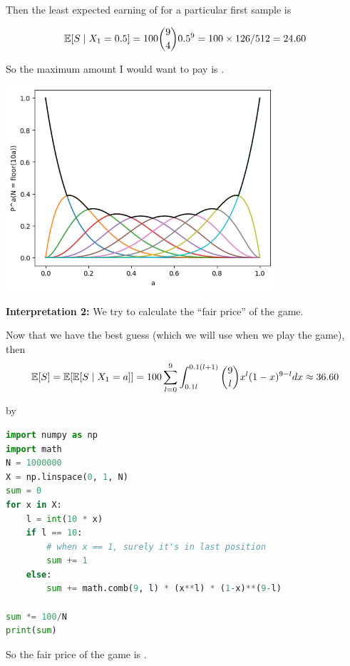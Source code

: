 \documentclass[a4paper, 10pt]{article}
\begin{document}
Then the least expected earning of for a particular first sample is 

\[
    \mathbb{E}[S \mid X_1 = 0.5] = 100 \binom{9}{4} 0.5^9 = 100 \times 126 / 512 = 24.60
\]

So the maximum amount I would want to pay is .

\begin{center}
    \includegraphics*[width = 10cm]{output.png}
\end{center}

\textbf{Interpretation 2: } We try to calculate the ``fair price'' of the game.

Now that we have the best guess (which we will use when we play the game), then
\[
\mathbb{E}[S] = \mathbb{E} [\mathbb{E}[S \mid X_1 = a]] = 100\sum_{l = 0}^{9} \int_{0.1l}^{0.1(l+1)}\binom{9}{l}x^l (1-x)^{9-l} dx \approx 36.60
\]

by
\begin{lstlisting}[language=Python]
import numpy as np
import math
N = 1000000
X = np.linspace(0, 1, N)
sum = 0
for x in X:
    l = int(10 * x)
    if l == 10:
        # when x == 1, surely it's in last position
        sum += 1
    else:
        sum += math.comb(9, l) * (x**l) * (1-x)**(9-l)

sum *= 100/N
print(sum)
\end{lstlisting}

So the fair price of the game is .
\end{document}
